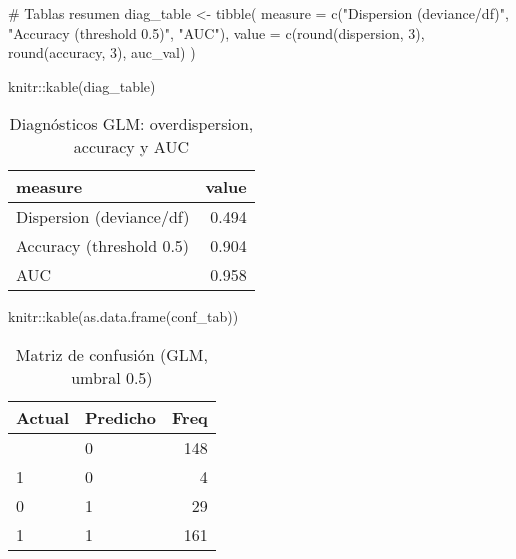 \documentclass[
  spanish,
  11pt,
  a4paper,
  DIV=11,
  numbers=noendperiod]{scrartcl}
\newenvironment{Shaded}{\begin{snugshade}}{\end{snugshade}}
\newcommand{\AttributeTok}[1]{\textcolor[rgb]{0.40,0.45,0.13}{#1}}
\newcommand{\CommentTok}[1]{\textcolor[rgb]{0.37,0.37,0.37}{#1}}
\newcommand{\DecValTok}[1]{\textcolor[rgb]{0.68,0.00,0.00}{#1}}
\newcommand{\FunctionTok}[1]{\textcolor[rgb]{0.28,0.35,0.67}{#1}}
\newcommand{\NormalTok}[1]{\textcolor[rgb]{0.00,0.23,0.31}{#1}}
\newcommand{\OtherTok}[1]{\textcolor[rgb]{0.00,0.23,0.31}{#1}}
\newcommand{\SpecialCharTok}[1]{\textcolor[rgb]{0.37,0.37,0.37}{#1}}
\newcommand{\StringTok}[1]{\textcolor[rgb]{0.13,0.47,0.30}{#1}}
\begin{document}
\begin{Shaded}
\begin{Highlighting}[numbers=left,,]
\CommentTok{\# Tablas resumen}
\NormalTok{diag\_table }\OtherTok{\textless{}{-}} \FunctionTok{tibble}\NormalTok{(}
  \AttributeTok{measure =} \FunctionTok{c}\NormalTok{(}\StringTok{"Dispersion (deviance/df)"}\NormalTok{, }\StringTok{"Accuracy (threshold 0.5)"}\NormalTok{, }\StringTok{"AUC"}\NormalTok{),}
  \AttributeTok{value =} \FunctionTok{c}\NormalTok{(}\FunctionTok{round}\NormalTok{(dispersion, }\DecValTok{3}\NormalTok{), }\FunctionTok{round}\NormalTok{(accuracy, }\DecValTok{3}\NormalTok{), auc\_val)}
\NormalTok{)}

\NormalTok{knitr}\SpecialCharTok{::}\FunctionTok{kable}\NormalTok{(diag\_table)}
\end{Highlighting}
\end{Shaded}

\begin{longtable}[]{@{}lr@{}}

\caption{\label{tbl-glm-diagnostics}Diagnósticos GLM: overdispersion,
accuracy y AUC}

\tabularnewline

\toprule\noalign{}
measure & value \\
\midrule\noalign{}
\endhead
\bottomrule\noalign{}
\endlastfoot
Dispersion (deviance/df) & 0.494 \\
Accuracy (threshold 0.5) & 0.904 \\
AUC & 0.958 \\

\end{longtable}

\begin{Shaded}
\begin{Highlighting}[numbers=left,,]
\NormalTok{knitr}\SpecialCharTok{::}\FunctionTok{kable}\NormalTok{(}\FunctionTok{as.data.frame}\NormalTok{(conf\_tab))}
\end{Highlighting}
\end{Shaded}

\begin{longtable}[]{@{}llr@{}}

\caption{\label{tbl-glm-confusion}Matriz de confusión (GLM, umbral 0.5)}

\tabularnewline

\toprule\noalign{}
Actual & Predicho & Freq \\
\midrule\noalign{}
\endhead
\bottomrule\noalign{}
\endlastfoot
0 & 0 & 148 \\
1 & 0 & 4 \\
0 & 1 & 29 \\
1 & 1 & 161 \\

\end{longtable}
\end{document}
